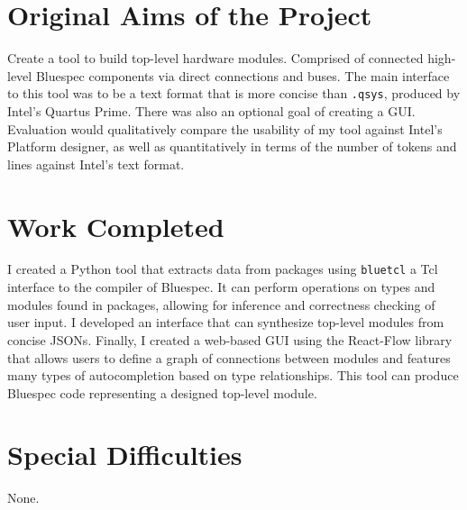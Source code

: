 \documentclass[12pt]{report}
\begin{document}
\section*{Original Aims of the Project}

Create a tool to build top-level hardware modules. Comprised of connected high-level Bluespec components via direct connections and buses. The main interface to this tool was to be a text format that is more concise than \verb!.qsys!, produced by Intel's Quartus Prime. There was also an optional goal of creating a GUI. Evaluation would qualitatively compare the usability of my tool against Intel's Platform designer, as well as quantitatively in terms of the number of tokens and lines against Intel's text format.

\section*{Work Completed}

I created a Python tool that extracts data from packages using \verb!bluetcl! a Tcl interface to the compiler of Bluespec. It can perform operations on types and modules found in packages, allowing for inference and correctness checking of user input. I developed an interface that can synthesize top-level modules from concise JSONs. Finally, I created a web-based GUI using the React-Flow library that allows users to define a graph of connections between modules and features many types of autocompletion based on type relationships. This tool can produce Bluespec code representing a designed top-level module.

\section*{Special Difficulties}

None.




\tableofcontents
\end{document}
